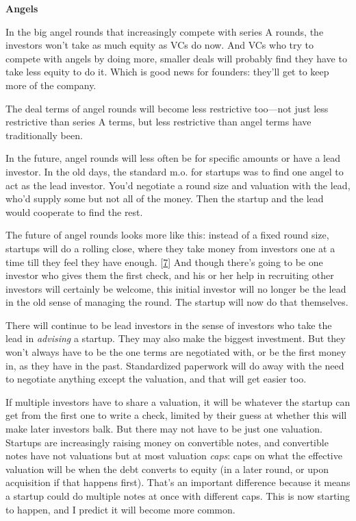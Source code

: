 \textbf{Angels}

In the big angel rounds that increasingly compete with series A rounds,
the investors won't take as much equity as VCs do now. And VCs who try
to compete with angels by doing more, smaller deals will probably find
they have to take less equity to do it. Which is good news for founders:
they'll get to keep more of the company.

The deal terms of angel rounds will become less restrictive too---not
just less restrictive than series A terms, but less restrictive than
angel terms have traditionally been.

In the future, angel rounds will less often be for specific amounts or
have a lead investor. In the old days, the standard m.o. for startups
was to find one angel to act as the lead investor. You'd negotiate a
round size and valuation with the lead, who'd supply some but not all of
the money. Then the startup and the lead would cooperate to find the
rest.

The future of angel rounds looks more like this: instead of a fixed
round size, startups will do a rolling close, where they take money from
investors one at a time till they feel they have enough.
{[}\hyperref[f7n]{7}{]} And though there's going to be one investor who
gives them the first check, and his or her help in recruiting other
investors will certainly be welcome, this initial investor will no
longer be the lead in the old sense of managing the round. The startup
will now do that themselves.

There will continue to be lead investors in the sense of investors who
take the lead in \emph{advising} a startup. They may also make the
biggest investment. But they won't always have to be the one terms are
negotiated with, or be the first money in, as they have in the past.
Standardized paperwork will do away with the need to negotiate anything
except the valuation, and that will get easier too.

If multiple investors have to share a valuation, it will be whatever the
startup can get from the first one to write a check, limited by their
guess at whether this will make later investors balk. But there may not
have to be just one valuation. Startups are increasingly raising money
on convertible notes, and convertible notes have not valuations but at
most valuation \emph{caps}: caps on what the effective valuation will be
when the debt converts to equity (in a later round, or upon acquisition
if that happens first). That's an important difference because it means
a startup could do multiple notes at once with different caps. This is
now starting to happen, and I predict it will become more common.

